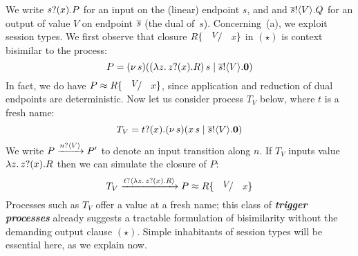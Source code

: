 We  write $s ? (x) .{P}$ 
for an input on the (linear) endpoint $s$, and 
and $\overline{s} ! \langle V \rangle . Q$
for an output of value $V$ 
on endpoint $\overline{s}$ (the dual of~$s$).
Concerning~(a), we exploit session types. 
We 
first 
observe that closure $R\subst{V}{x}$ 
in $(\star)$
is context bisimilar to the process:
\begin{equation}\label{equ:1}
	P = (\nu\, s)((\lambda z.\,z ? (x) .{R})\, {s} \;|\; \overline{s} ! \langle V \rangle . \mathbf{0})
\end{equation}
In fact,
we do have $P \wbc R\subst{V}{x}$, 
since 
application and reduction of dual endpoints 
are deterministic.  
Now let us
consider process $T_{V}$ below, where $t$ is a fresh name:
\begin{equation}\label{equ:0}
T_{V} = t ? (x) . (\nu\, s)(x\, {s} \;|\; \overline{s} ! \langle V \rangle . \mathbf{0})
\end{equation}
We write $P \xrightarrow{n ? \langle V \rangle} P'$ to denote an input transition along $n$.
If $T_{V}$ inputs value $\lambda z.\,z ? (x) . R$ then
we can simulate the closure of $P$:
\begin{equation}\label{equ:2}
T_{V}
\by{\bactinp{t}{\abs{z}{\binp{z}{x} R}}} P 
\wbc 
R\subst{V}{x}
\end{equation}
Processes such as $T_{V}$ 
offer a value at a fresh name; this class of 
{\bf\em trigger processes} 
already suggests a tractable formulation of 
bisimilarity without the demanding 
output clause $(\star)$. 
Simple inhabitants of session types will be essential here, as we explain now.

\smallskip


